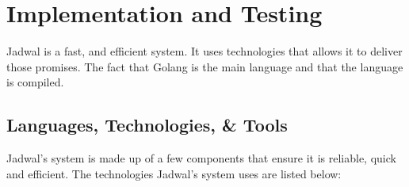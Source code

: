 \chapter{Implementation and Testing}

Jadwal is a fast, and efficient system. It uses technologies that allows it to deliver those promises. The fact that Golang is the main language and that the language is compiled.

\section{Languages, Technologies, \& Tools}

Jadwal's system is made up of a few components that ensure it is reliable, quick and efficient. The technologies Jadwal's system uses are listed below:

